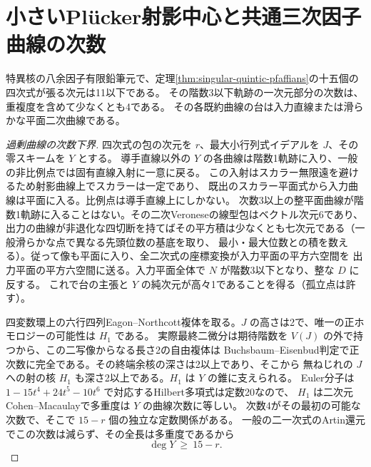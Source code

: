 \section{小さいPlücker射影中心と共通三次因子曲線の次数}
\label{sec:deficient-plucker-centers}
\begin{theorem}\label{thm:deficient-plucker-centers}
特異核の八余因子有限鉛筆元で、定理\ref{thm:singular-quintic-pfaffians}の十五個の四次式が張る次元は11以下である。
その階数3以下軌跡の一次元部分の次数は、重複度を含めて少なくとも4である。
その各既約曲線の台は入力直線または滑らかな平面二次曲線である。
\end{theorem}
\begin{proof}[過剰曲線の次数下界]
四次式の包の次元を $r$、最大小行列式イデアルを $J$、その零スキームを $Y$ とする。
導手直線以外の $Y$ の各曲線は階数1軌跡に入り、一般の非比例点では固有直線入射に一意に戻る。
この入射はスカラー無限遠を避けるため射影曲線上でスカラーは一定であり、
既出のスカラー平面式から入力曲線は平面に入る。比例点は導手直線上にしかない。
次数3以上の整平面曲線が階数1軌跡に入ることはない。その二次Veroneseの線型包はベクトル次元6であり、
出力の曲線が非退化な四切断を持てばその平方積は少なくとも七次元である（一般滑らかな点で異なる先頭位数の基底を取り、
最小・最大位数との積を数える）。従って像も平面に入り、全二次式の座標変換が入力平面の平方六空間を
出力平面の平方六空間に送る。入力平面全体で $N$ が階数3以下となり、整な $D$ に反する。
これで台の主張と $Y$ の純次元が高々1であることを得る（孤立点は許す）。

四変数環上の六行四列Eagon--Northcott複体を取る。$J$ の高さは2で、唯一の正ホモロジーの可能性は $H_1$ である。
実際最終二微分は期待階数を $V(J)$ の外で持つから、この二写像からなる長さ2の自由複体は
Buchsbaum--Eisenbud判定で正次数に完全である。その終端余核の深さは2以上であり、そこから
無ねじれの $J$ への射の核 $H_1$ も深さ2以上である。$H_1$ は $Y$ の錐に支えられる。
Euler分子は $1-15t^4+24t^5-10t^6$ で対応するHilbert多項式は定数20なので、
$H_1$ は二次元Cohen--Macaulayで多重度は $Y$ の曲線次数に等しい。
次数4がその最初の可能な次数で、そこで $15-r$ 個の独立な定数関係がある。
一般の二一次式のArtin還元でこの次数は減らず、その全長は多重度であるから
\[
                            \deg Y\ \ge\ 15-r .
\]
\end{proof}

